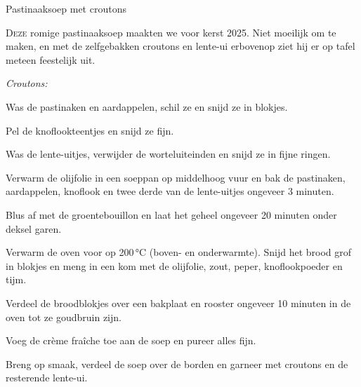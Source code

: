 \begin{recipe}{Pastinaaksoep met croutons}


\lettrine{D}{eze} romige pastinaaksoep maakten we voor kerst 2025. Niet moeilijk
om te maken, en met de zelfgebakken croutons en lente-ui erbovenop ziet hij er
op tafel meteen feestelijk uit.

\begin{ingredients}
\end{ingredients}

\noindent\textit{Croutons:}
\begin{ingredients}
\end{ingredients}

\begin{steps}
  \item Was de pastinaken en aardappelen, schil ze en snijd ze in blokjes.
  \item Pel de knoflookteentjes en snijd ze fijn.
  \item Was de lente-uitjes, verwijder de worteluiteinden en snijd ze in fijne
        ringen.
  \item Verwarm de olijfolie in een soeppan op middelhoog vuur en bak de pastinaken,
        aardappelen, knoflook en twee derde van de lente-uitjes ongeveer
        3 minuten.
  \item Blus af met de groentebouillon en laat het geheel ongeveer 20 minuten
        onder deksel garen.
  \item Verwarm de oven voor op 200\,°C (boven- en onderwarmte). Snijd het brood grof in blokjes en meng
        in een kom met de olijfolie, zout, peper, knoflookpoeder en tijm.
  \item Verdeel de broodblokjes over een bakplaat en rooster ongeveer
        10 minuten in de oven tot ze goudbruin zijn.
  \item Voeg de crème fraîche toe aan de soep en pureer alles fijn.
  \item Breng op smaak, verdeel de soep over de borden en garneer met
        croutons en de resterende lente-ui.
\end{steps}
\end{recipe}

